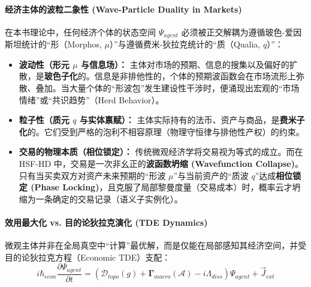 \paragraph{经济主体的波粒二象性 (Wave-Particle Duality in Markets)}
在本书理论中，任何经济个体的状态空间 $\Psi_{agent}$ 必须被正交解耦为遵循玻色-爱因斯坦统计的“形（Morphos, $\mu$）”与遵循费米-狄拉克统计的“质（Qualia, $q$）”：
\begin{itemize}
    \item \textbf{波动性（形元 $\mu$ 与信息场）：} 主体对市场的预期、信息的搜集以及偏好的扩散，是\textbf{玻色子化}的。信息是非排他性的，个体的预期波函数会在市场流形上弥散、叠加。当大量个体的“形波包”发生建设性干涉时，便涌现出宏观的“市场情绪”或“共识趋势”（Herd Behavior）。
    \item \textbf{粒子性（质元 $q$ 与实体禀赋）：} 主体实际持有的法币、资产与商品，是\textbf{费米子化}的。它们受到严格的泡利不相容原理（物理守恒律与排他性产权）的约束。
    \item \textbf{交易的物理本质（相位锁定）：} 传统微观经济学将交易视为等式的成立。而在 HSF-HD 中，交易是一次非幺正的\textbf{波函数坍缩 (Wavefunction Collapse)}。只有当买卖双方对资产未来预期的“形波 $\mu$”与当前资产的“质波 $q$”达成\textbf{相位锁定 (Phase Locking)}，且克服了局部黎曼度量（交易成本）时，概率云才坍缩为一条确定的交易记录（语义子实例化）。
\end{itemize}

\paragraph{效用最大化 vs. 目的论狄拉克演化 (TDE Dynamics)}
微观主体并非在全局真空中“计算”最优解，而是仅能在局部感知其经济空间，并受目的论狄拉克方程（Economic TDE）支配：
\begin{equation}
    i \hbar_{econ} \frac{\partial \Psi_{agent}}{\partial t} = \left( \mathcal{D}_{topo}(g) + \mathbf{\Gamma}_{macro}(\mathcal{A}) - i\Lambda_{diss} \right) \Psi_{agent} + \vec{J}_{ext}
    \label{eq:economic_tde}
\end{equation}


